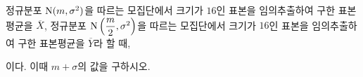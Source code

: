 정규분포 $\mathrm{N}(m{,}\mkern3mu\mathopen{}\sigma^2)$을 따르는 모집단에서 크기가 $16$인 표본을 임의추출하여 구한 표본평균을 $\overline{X}$, 정규분포 $\mathrm{N}\left(\dfrac{m}{2}{,}\mkern3mu\mathopen{}\sigma^2\right)$을 따르는 모집단에서 크기가 $16$인 표본을 임의추출하여 구한 표본평균을 $\overline{Y}$라 할 때, \par\smallskip{}\par{}\par\smallskip\noindent 이다. 이때 $m+\sigma$의 값을 구하시오. 
